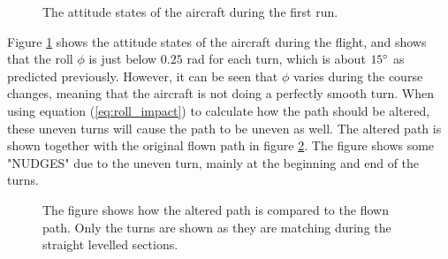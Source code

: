 \begin{figure}[]
    \centering
    \caption{The attitude states of the aircraft during the first run.}
	\label{fig:first_run_states}
\end{figure}

Figure \ref{fig:first_run_states} shows the attitude states of the aircraft during the flight, and shows that the roll $\phi$ is just below $0.25$ rad for each turn, which is about $15 \degree$ as predicted previously. However, it can be seen that $\phi$ varies during the course changes, meaning that the aircraft is not doing a perfectly smooth turn. When using equation (\ref{eq:roll_impact}) to calculate how the path should be altered, these uneven turns will cause the path to be uneven as well. The altered path is shown together with the original flown path in figure \ref{fig:altered_vs_flown}. The figure shows some "NUDGES" due to the uneven turn, mainly at the beginning and end of the turns.

\begin{figure}[]
    \centering
    \caption{The figure shows how the altered path is compared to the flown path. Only the turns are shown as they are matching during the straight levelled sections.}
	\label{fig:altered_vs_flown}
\end{figure}


